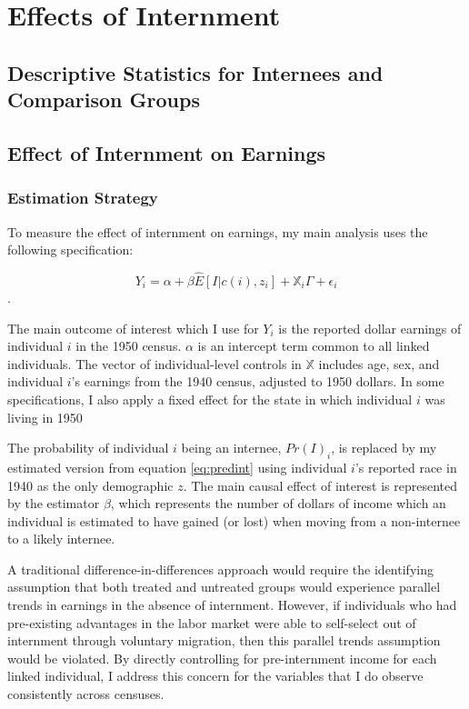 \documentclass[12pt]{article}
\begin{document}
\section{Effects of Internment}
\label{sec:orgf1ec2d8}
\subsection{Descriptive Statistics for Internees and Comparison Groups}
\label{sec:orgb5b1d7e}
\subsection{Effect of Internment on Earnings}
\label{sec:org0999d97}
\subsubsection{Estimation Strategy}
\label{sec:orgf16b137}
To measure the effect of internment on earnings,
my main analysis uses the following specification:

\begin{equation}\label{eq:mainreg}
  Y_i = \alpha + \beta \hat{E}[I|c(i), z_i] + \mathbb{X}_i \Gamma + \epsilon_i
\end{equation}.

The main outcome of interest which I use for \(Y_i\)
is the reported dollar earnings of individual \(i\) in the 1950 census.
\(\alpha\) is an intercept term common to all linked individuals.
The vector of individual-level controls in \(\mathbb{X}\)
includes age, sex, and individual \(i\)'s earnings from the 1940 census,
adjusted to 1950 dollars.
In some specifications,
I also apply a fixed effect for the state
in which individual \(i\) was living in 1950

The probability of individual \(i\) being an internee, \(Pr(I)_i\),
is replaced by my estimated version from equation \ref{eq:predint}
using individual \(i\)'s reported race in 1940 as the only demographic \(z\).
The main causal effect of interest is represented by the estimator \(\beta\),
which represents the number of dollars of income
which an individual is estimated to have gained (or lost)
when moving from a non-internee to a likely internee.

A traditional difference-in-differences approach would require the
identifying assumption that both treated and untreated groups
would experience parallel trends in earnings in the absence of internment.
However, if individuals who had pre-existing advantages in the labor market
were able to self-select out of internment through voluntary migration,
then this parallel trends assumption would be violated.
By directly controlling for pre-internment income for each linked individual,
I address this concern for the variables that I do observe consistently
across censuses.
\end{document}
